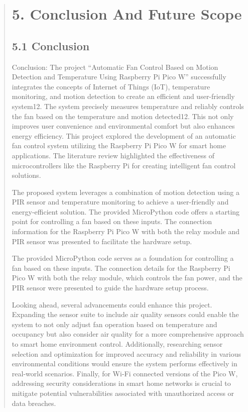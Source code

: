 \documentclass[12pt]{report}
\begin{document}
	\clearpage

	\begin{quote}
		\section{5. Conclusion And Future Scope}
		\subsection{5.1 Conclusion}
			Conclusion: The project “Automatic Fan Control Based on Motion Detection and Temperature Using Raspberry Pi Pico W” successfully integrates the concepts of Internet of Things (IoT), temperature monitoring, and motion detection to create an efficient and user-friendly system12. The system precisely measures temperature and reliably controls the fan based on the temperature and motion detected12. This not only improves user convenience and environmental comfort but also enhances energy efficiency. This project explored the development of an automatic fan control system utilizing the Raspberry Pi Pico W for smart home applications. The literature review highlighted the effectiveness of microcontrollers like the Raspberry Pi for creating intelligent fan control solutions.
			
			The proposed system leverages a combination of motion detection using a PIR sensor and temperature monitoring to achieve a user-friendly and energy-efficient solution. The provided MicroPython code offers a starting point for controlling a fan based on these inputs. The connection information for the Raspberry Pi Pico W with both the relay module and PIR sensor was presented to facilitate the hardware setup.
			
			The provided MicroPython code serves as a foundation for controlling a fan based on these inputs. The connection details for the Raspberry Pi Pico W with both the relay module, which controls the fan power, and the PIR sensor were presented to guide the hardware setup process.
			
			Looking ahead, several advancements could enhance this project. Expanding the sensor suite to include air quality sensors could enable the system to not only adjust fan operation based on temperature and occupancy but also consider air quality for a more comprehensive approach to smart home environment control. Additionally, researching sensor selection and optimization for improved accuracy and reliability in various environmental conditions would ensure the system performs effectively in real-world scenarios. Finally, for Wi-Fi connected versions of the Pico W, addressing security considerations in smart home networks is crucial to mitigate potential vulnerabilities associated with unauthorized access or data breaches.
			

\end{quote}
\end{document}

